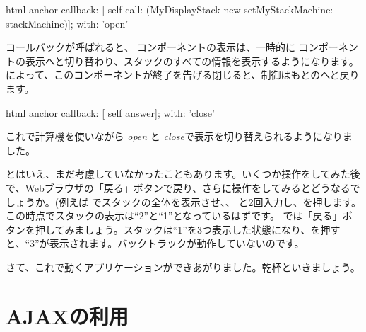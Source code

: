 \documentclass[a4paper,10pt,twoside]{book}
\begin{document}
\begin{code}{}
html anchor
	callback: [ self call: (MyDisplayStack new setMyStackMachine: stackMachine)];
	with: 'open'
\end{code}

コールバックが呼ばれると、 コンポーネントの表示は、一時的に コンポーネントの表示へと切り替わり、スタックのすべての情報を表示するようになります。によって、このコンポーネントが終了を告げる閉じると、制御はもとのへと戻ります。


\begin{code}{}
html anchor
	callback: [ self answer];
	with: 'close'
\end{code}

これで計算機を使いながら \emph{open} と \emph{close}で表示を切り替えられるようになりました。

とはいえ、まだ考慮していなかったこともあります。いくつか操作をしてみた後で、Webブラウザの「戻る」ボタンで戻り、さらに操作をしてみるとどうなるでしょうか。(例えば でスタックの全体を表示させ、、 と2回入力し、\menu {+}を押します。この時点でスタックの表示は``2''と``1''となっているはずです。
では「戻る」ボタンを押してみましょう。スタックは``1''を3つ表示した状態になり、\menu {+}を押すと、``3''が表示されます。バックトラックが動作していないのです。


さて、これで動くアプリケーションができあがりました。乾杯といきましょう。

\section{AJAXの利用}

\end{document}

